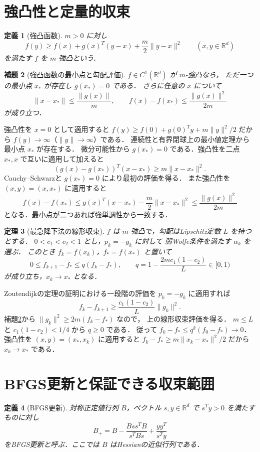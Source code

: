 \documentclass[a5paper,10pt,onecolumn]{jsarticle}
\makeatletter
\theoremstyle{mathnotetheorem}
\newtheorem{theorem}{定理}[section]
\newtheorem{definition}[theorem]{定義}
\newtheorem{lemma}[theorem]{補題}
\renewcommand{\proofname}{証明}
\renewenvironment{proof}[1][\proofname]{%
  \par\pushQED{\qed}\normalfont\topsep4\p@\@plus2\p@\relax
  \trivlist\item[\hskip\labelsep\bfseries #1]\ignorespaces
}{\popQED\endtrivlist\@endpefalse}
\newcommand{\norm}[1]{\lVert #1\rVert}
\makeatother
\begin{document}
\section{強凸性と定量的収束}
\begin{definition}[強凸函数]
$m>0$ に対し
\[
 f(y)\ge f(x)+g(x)^T(y-x)+\frac m2\norm{y-x}^2
 \qquad(x,y\in\mathbb R^d)
\]
を満たす $f$ を $m$-強凸という．
\end{definition}

\begin{lemma}[強凸函数の最小点と勾配評価]\label{lem:strong}
$f\in C^1(\mathbb R^d)$ が $m$-強凸なら，
ただ一つの最小点 $x_*$ が存在し $g(x_*)=0$ である．
さらに任意の $x$ について
\[
 \norm{x-x_*}\le\frac{\norm{g(x)}}m,
 \qquad
 f(x)-f(x_*)\le\frac{\norm{g(x)}^2}{2m}
\]
が成り立つ．
\end{lemma}
\begin{proof}
強凸性を $x=0$ として適用すると
$f(y)\ge f(0)+g(0)^Ty+m\norm y^2/2$ だから
$f(y)\to\infty$（$\norm y\to\infty$）である．
連続性と有界閉球上の最小値定理から最小点 $x_*$ が存在する．
微分可能性から $g(x_*)=0$ である．強凸性を二点
$x_*,x$ で互いに適用して加えると
\[
 (g(x)-g(x_*))^T(x-x_*)\ge m\norm{x-x_*}^2.
\]
Cauchy--Schwarzと $g(x_*)=0$ により最初の評価を得る．
また強凸性を $(x,y)=(x,x_*)$ に適用すると
\[
 f(x)-f(x_*)\le g(x)^T(x-x_*)-
                  \frac m2\norm{x-x_*}^2
 \le\frac{\norm{g(x)}^2}{2m}
\]
となる．最小点が二つあれば強単調性から一致する．
\end{proof}

\begin{theorem}[最急降下法の線形収束]\label{thm:linear}
$f$ は $m$-強凸で，勾配はLipschitz定数 $L$ を持つとする．
$0<c_1<c_2<1$ とし，$p_k=-g_k$ に対して
弱Wolfe条件を満たす $\alpha_k$ を選ぶ．
このとき $f_k=f(x_k)$，$f_*=f(x_*)$ と置いて
\[
 0\le f_{k+1}-f_*\le q(f_k-f_*),
 \qquad q=1-\frac{2mc_1(1-c_2)}L\in[0,1)
\]
が成り立ち，$x_k\to x_*$ となる．
\end{theorem}
\begin{proof}
Zoutendijkの定理の証明における一段階の評価を
$p_k=-g_k$ に適用すれば
\[
 f_k-f_{k+1}\ge \frac{c_1(1-c_2)}L\norm{g_k}^2.
\]
補題\ref{lem:strong}から
$\norm{g_k}^2\ge2m(f_k-f_*)$ なので，
上の線形収束評価を得る．
$m\le L$ と $c_1(1-c_2)<1/4$ から $q\ge0$ である．
従って $f_k-f_*\le q^k(f_0-f_*)\to0$．
強凸性を $(x,y)=(x_*,x_k)$ に適用すると
$f_k-f_*\ge m\norm{x_k-x_*}^2/2$ だから $x_k\to x_*$ である．
\end{proof}

\section{BFGS更新と保証できる収束範囲}
\begin{definition}[BFGS更新]
対称正定値行列 $B$，ベクトル $s,y\in\mathbb R^d$ で
$s^Ty>0$ を満たすものに対し
\[
 B_+=B-\frac{Bss^TB}{s^TBs}+\frac{yy^T}{s^Ty}
\]
をBFGS更新と呼ぶ．ここでは $B$ はHessianの近似行列である．
\end{definition}
\end{document}
